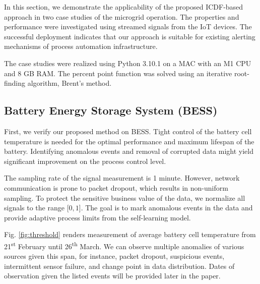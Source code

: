 In this section, we demonstrate the applicability of the proposed ICDF-based approach in two case studies of the microgrid operation. The properties and performance were investigated using streamed signals from the IoT devices. The successful deployment indicates that our approach is suitable for existing alerting mechanisms of process automation infrastructure.

The case studies were realized using Python 3.10.1 on a MAC with an M1 CPU and 8 GB RAM. The percent point function was solved using an iterative root-finding algorithm, Brent's method.

\subsection{Battery Energy Storage System (BESS)}\label{AA:Case1}
First, we verify our proposed method on BESS. Tight control of the battery cell temperature is needed for the optimal performance and maximum lifespan of the battery. Identifying anomalous events and removal of corrupted data might yield significant improvement on the process control level. 

The sampling rate of the signal measurement is 1 minute. However, network communication is prone to packet dropout, which results in non-uniform sampling. To protect the sensitive business value of the data, we normalize all signals to the range $[0, 1$]. The goal is to mark anomalous events in the data and provide adaptive process limits from the self-learning model. 

Fig. \ref{fig:threshold} renders measurement of average battery cell temperature from 21\textsuperscript{st} February until 26\textsuperscript{th} March. We can observe multiple anomalies of various sources given this span, for instance, packet dropout, suspicious events, intermittent sensor failure, and change point in data distribution. Dates of observation given the listed events will be provided later in the paper. 

